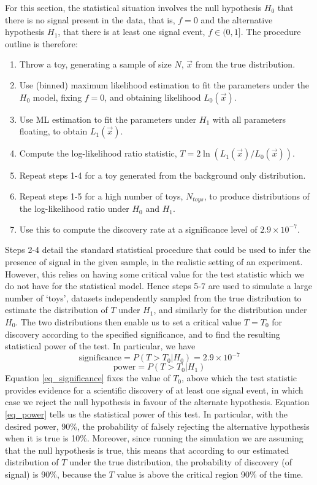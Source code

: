 \documentclass[12pt]{article}
\begin{document}
For this section, the statistical situation involves the null hypothesis $H_0$ that there is no signal present in the data, that is, $f=0$ and the alternative hypothesis $H_1$, that there is at least one signal event, $f\in(0,1]$.
The procedure outline is therefore:
\begin{enumerate}
\label{sim_study_procedure}
    \item Throw a toy, generating a sample of size $N$, $\vec{x}$ from the true distribution.
    \item Use (binned) maximum likelihood estimation to fit the parameters under the $H_0$ model, fixing $f=0$, and obtaining likelihood $L_0(\vec{x})$.
    \item Use ML estimation to fit the parameters under $H_1$ with all parameters floating, to obtain $L_1(\vec{x})$.
    \item Compute the log-likelihood ratio statistic, $T = 2\ln(L_1(\vec{x})/L_0(\vec{x}))$.
    \item Repeat steps 1-4 for a toy generated from the background only distribution.
    \item Repeat steps 1-5 for a high number of toys, $N_{toys}$, to produce distributions of the log-likelihood ratio under $H_0$ and $H_1$.
    \item Use this to compute the discovery rate at a significance level of $2.9\times10^{-7}$.
\end{enumerate}
Steps 2-4 detail the standard statistical procedure that could be used to infer the presence of signal in the given sample, in the realistic setting of an experiment.
However, this relies on having some critical value for the test statistic which we do not have for the statistical model.
Hence steps 5-7 are used to simulate a large number of `toys', datasets independently sampled from the true distribution to estimate the distribution of $T$ under $H_1$, and similarly for the distribution under $H_0$.
The two distributions then enable us to set a critical value $T=T_0$ for discovery according to the specified significance, and to find the resulting statistical power of the test.
In particular, we have
\begin{equation}
\label{eq_significance}
    \text{significance} = P(T>T_0|H_0) = 2.9\times10^{-7}
\end{equation}
\begin{equation}
\label{eq_power}
    \text{power} = P(T>T_0|H_1)
\end{equation}
Equation \ref{eq_significance} fixes the value of $T_0$, above which the test statistic provides evidence for a scientific discovery of at least one signal event, in which case we reject the null hypothesis in favour of the alternate hypothesis.
Equation \ref{eq_power} tells us the statistical power of this test.
In particular, with the desired power, 90\%, the probability of falsely rejecting the alternative hypothesis when it is true is 10\%.
Moreover, since running the simulation we are assuming that the null hypothesis is true, this means that according to our estimated distribution of $T$ under the true distribution, the probability of discovery (of signal) is 90\%, because the $T$ value is above the critical region 90\% of the time.
\end{document}
